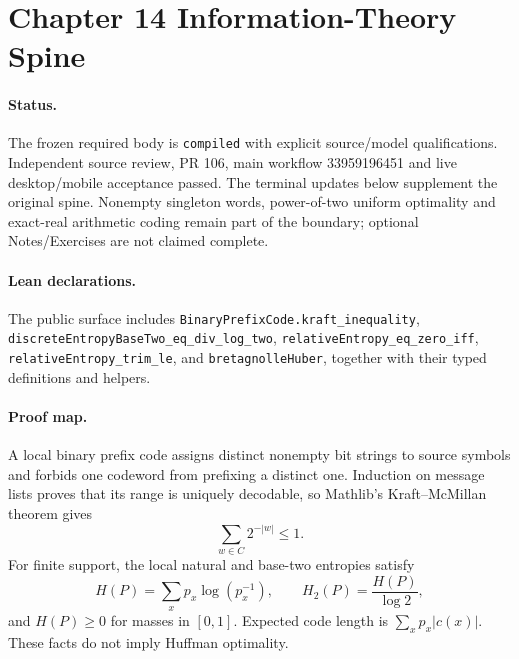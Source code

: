 \section{Chapter 14 Information-Theory Spine}

\paragraph{Status.}
The frozen required body is \texttt{compiled} with explicit source/model
qualifications. Independent source review, PR 106, main workflow 33959196451
and live desktop/mobile acceptance passed. The terminal updates below
supplement the original spine. Nonempty singleton words, power-of-two uniform
optimality and exact-real arithmetic coding remain part of the boundary;
optional Notes/Exercises are not claimed complete.

\paragraph{Lean declarations.}
The public surface includes \texttt{BinaryPrefixCode.kraft\_inequality},
\texttt{discreteEntropyBaseTwo\_eq\_div\_log\_two},
\texttt{relativeEntropy\_eq\_zero\_iff},
\texttt{relativeEntropy\_trim\_le}, and
\texttt{bretagnolleHuber}, together with their typed definitions and helpers.

\paragraph{Proof map.}
A local binary prefix code assigns distinct nonempty bit strings to source
symbols and forbids one codeword from prefixing a distinct one. Induction on
message lists proves that its range is uniquely decodable, so Mathlib's
Kraft--McMillan theorem gives
\[
  \sum_{w\in C}2^{-|w|}\le 1.
\]
For finite support, the local natural and base-two entropies satisfy
\[
 H(P)=\sum_x p_x\log(p_x^{-1}),\qquad
 H_2(P)=\frac{H(P)}{\log 2},
\]
and $H(P)\ge0$ for masses in $[0,1]$. Expected code length is
$\sum_x p_x|c(x)|$. These facts do not imply Huffman optimality.

